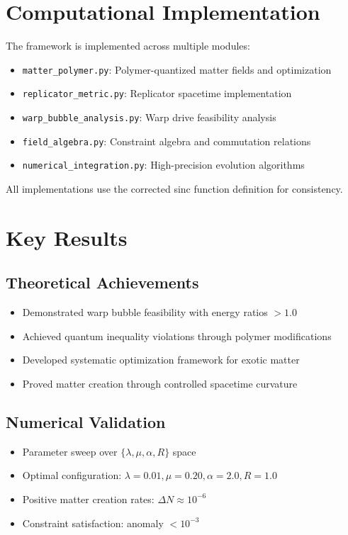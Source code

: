 \documentclass[11pt]{article}
\begin{document}
\section{Computational Implementation}

The framework is implemented across multiple modules:

\begin{itemize}
\item \texttt{matter\_polymer.py}: Polymer-quantized matter fields and optimization
\item \texttt{replicator\_metric.py}: Replicator spacetime implementation
\item \texttt{warp\_bubble\_analysis.py}: Warp drive feasibility analysis
\item \texttt{field\_algebra.py}: Constraint algebra and commutation relations
\item \texttt{numerical\_integration.py}: High-precision evolution algorithms
\end{itemize}

All implementations use the corrected sinc function definition for consistency.

\section{Key Results}

\subsection{Theoretical Achievements}
\begin{itemize}
\item Demonstrated warp bubble feasibility with energy ratios $> 1.0$
\item Achieved quantum inequality violations through polymer modifications
\item Developed systematic optimization framework for exotic matter
\item Proved matter creation through controlled spacetime curvature
\end{itemize}

\subsection{Numerical Validation}
\begin{itemize}
\item Parameter sweep over $\{\lambda, \mu, \alpha, R\}$ space
\item Optimal configuration: $\lambda=0.01, \mu=0.20, \alpha=2.0, R=1.0$
\item Positive matter creation rates: $\Delta N \approx 10^{-6}$
\item Constraint satisfaction: anomaly $< 10^{-3}$
\end{itemize}
\end{document}
